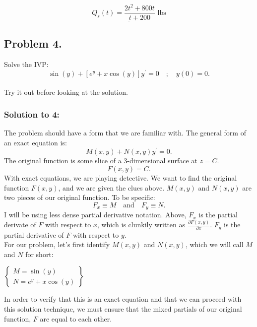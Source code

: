 \documentclass[a4paper,12pt]{article} %
\begin{document}
$$ \underline{\boxed{Q_s(t) = \frac{2t^2 + 800t}{t + 200} \text{ lbs}}} $$

\pagebreak

\subsection*{Problem 4.} Solve the IVP:
$$ \sin(y) + \left[e^y + x\cos(y)\right]y^{\prime} = 0 \quad; \quad y(0)=0. $$
\\
 
Try it out before looking at the solution.
 \pagebreak
 
 \subsubsection*{Solution to 4:}
 The problem should have a form that we are familiar with. The general form of an exact equation is:
\begin{equation}
	M(x,y) + N(x,y)y^{\prime} = 0.
\label{eq:1}
\end{equation}
The original function is some slice of a 3-dimensional surface at $z=C$. 
\begin{equation}
	F(x,y) = C.
	\label{eq:5}
\end{equation}
 With exact equations, we are playing detective. We want to find the original function $F(x,y)$, and we are given the clues above. $M(x,y)$ and $N(x,y)$ are two pieces of our original function. To be specific:
\begin{equation}
	F_x \equiv M \quad \text{and} \quad F_y \equiv N.
	\label{eq:2}
\end{equation}
I will be using less dense partial derivative notation. Above, $F_x$ is the partial derivate of $F$ with respect to $x$, which is clunkily written as $\frac{\partial F(x,y)}{\partial x}$. $F_y$ is the partial derivative of $F$ with respect to $y$.\\

 
 For our problem, let's first identify $M(x,y)$ and $N(x,y)$, which we will call $M$ and $N$ for short:

 \begin{center}
$\left\{
\begin{array}{l}
 	 M = \sin(y)\\
 N = e^y + x\cos(y)
\end{array}
\right\}$
\end{center}
In order to verify that this is an exact equation and that we can proceed with this solution technique, we must ensure that the mixed partials of our original function, $F$ are equal to each other.\\
\end{document}
